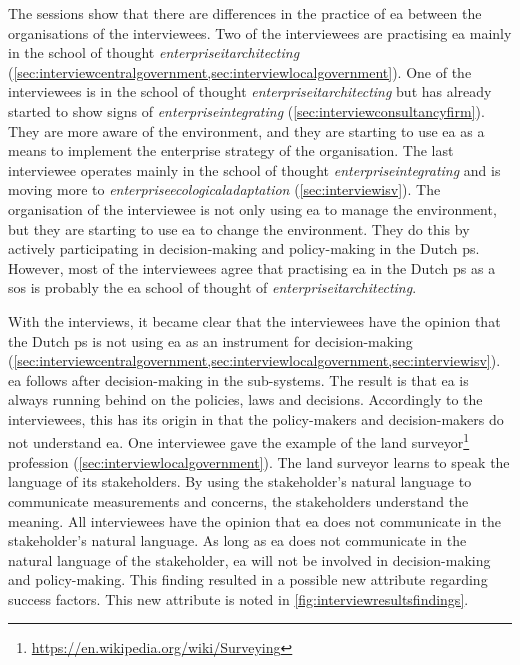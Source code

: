 The sessions show that there are differences in the practice of \gls{ea} between the organisations of the interviewees. Two of the interviewees are practising \gls{ea} mainly in the school of thought \textit{\gls{enterpriseitarchitecting}} (\cref{sec:interviewcentralgovernment,sec:interviewlocalgovernment}). One of the interviewees is in the school of thought \textit{\gls{enterpriseitarchitecting}} but has already started to show signs of \textit{\gls{enterpriseintegrating}} (\cref{sec:interviewconsultancyfirm}). They are more aware of the environment, and they are starting to use \gls{ea} as a means to implement the enterprise strategy of the organisation. The last interviewee operates mainly in the school of thought \textit{\gls{enterpriseintegrating}} and is moving more to \textit{\gls{enterpriseecologicaladaptation}} (\cref{sec:interviewisv}). The organisation of the interviewee is not only using \gls{ea} to manage the environment, but they are starting to use \gls{ea} to change the environment. They do this by actively participating in decision-making and policy-making in the Dutch \gls{ps}. However, most of the interviewees agree that practising \gls{ea} in the Dutch \gls{ps} as a \gls{sos} is probably the \gls{ea} school of thought of \textit{\gls{enterpriseitarchitecting}}.

With the interviews, it became clear that the interviewees have the opinion that the Dutch \gls{ps} is not using \gls{ea} as an instrument for decision-making (\cref{sec:interviewcentralgovernment,sec:interviewlocalgovernment,sec:interviewisv}). \gls{ea} follows after decision-making in the sub-systems. The result is that \gls{ea} is always running behind on the policies, laws and decisions. Accordingly to the interviewees, this has its origin in that the policy-makers and decision-makers do not understand \gls{ea}. One interviewee gave the example of the land surveyor\footnote{\url{https://en.wikipedia.org/wiki/Surveying}} profession (\cref{sec:interviewlocalgovernment}). The land surveyor learns to speak the language of its stakeholders. By using the stakeholder's natural language to communicate measurements and concerns, the stakeholders understand the meaning. All interviewees have the opinion that \gls{ea} does not communicate in the stakeholder's natural language. As long as \gls{ea} does not communicate in the natural language of the stakeholder, \gls{ea} will not be involved in decision-making and policy-making. This finding resulted in a possible new \gls{attribute} regarding success factors. This new \gls{attribute} is noted in \cref{fig:interviewresultsfindings}.
